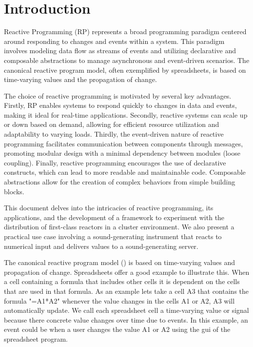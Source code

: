 \documentclass[a4paper]{book}
\begin{document}
\tableofcontents%

\mainmatter%
\chapter{Introduction}

Reactive Programming (RP) represents a broad programming paradigm centered around responding to changes and events within a system. This paradigm involves modeling data flow as streams of events and utilizing declarative and composable abstractions to manage asynchronous and event-driven scenarios. The canonical reactive program model, often exemplified by spreadsheets, is based on time-varying values and the propagation of change. 

The choice of reactive programming is motivated by several key advantages. Firstly, RP enables systems to respond quickly to changes in data and events, making it ideal for real-time applications. Secondly, reactive systems can scale up or down based on demand, allowing for efficient resource utilization and adaptability to varying loads. Thirdly, the event-driven nature of reactive programming facilitates communication between components through messages, promoting modular design with a minimal dependency between modules (loose coupling). Finally, reactive programming encourages the use of declarative constructs, which can lead to more readable and maintainable code. Composable abstractions allow for the creation of complex behaviors from simple building blocks.

This document delves into the intricacies of reactive programming, its applications, and the development of a framework to experiment with the distribution of first-class reactors in a cluster environment. We also present a practical use case involving a sound-generating instrument that reacts to numerical input and delivers values to a sound-generating server.

The canonical reactive program model (\cite{DBLP:journals/csur/BainomugishaCCMM13}) is based on time-varying values and propagation of change. Spreadsheets offer a good example to illustrate this. When a cell containing a formula that includes other cells it is dependent on the cells that are used in that formula. As an example lets take a cell A3 that contains the formula "=A1*A2" whenever the value changes in the cells A1 or A2, A3 will automatically update. We call each spreadsheet cell a time-varying value or signal because there concrete value changes over time due to events. In this example, an event could be when a user changes the value A1 or A2 using the gui of the spreadsheet program.
\end{document}

